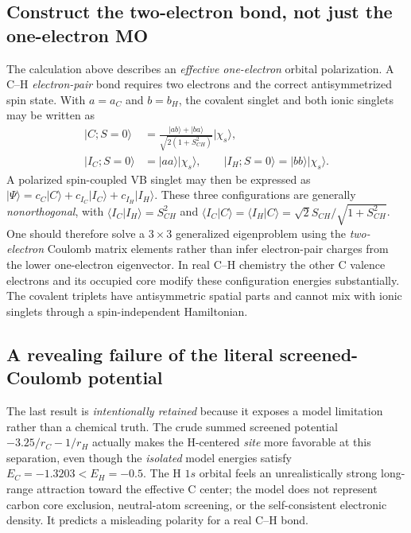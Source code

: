 \documentclass[11pt,letterpaper]{article}
\newcommand{\ket}[1]{\lvert #1\rangle}
\begin{document}
\subsection{Construct the two-electron bond, not just the one-electron MO}
The calculation above describes an \emph{effective one-electron} orbital polarization. A C--H \emph{electron-pair} bond requires two electrons and the correct antisymmetrized spin state. With $a=a_C$ and $b=b_H$, the covalent singlet and both ionic singlets may be written as
\begin{equation}\label{eq:chcovionic}
\begin{aligned}
\ket{C;S=0}&=\frac{\ket{ab}+\ket{ba}}{\sqrt{2(1+S_{CH}^2)}}\ket{\chi_s},\\
\ket{I_C;S=0}&=\ket{aa}\ket{\chi_s},\qquad
\ket{I_H;S=0}=\ket{bb}\ket{\chi_s}.
\end{aligned}
\end{equation}
A polarized spin-coupled VB singlet may then be expressed as $\ket{\Psi}=c_C\ket{C}+c_{I_C}\ket{I_C}+c_{I_H}\ket{I_H}$. These three configurations are generally \emph{nonorthogonal}, with $\langle I_C|I_H\rangle=S_{CH}^2$ and $\langle I_C|C\rangle=\langle I_H|C\rangle=\sqrt2S_{CH}/\sqrt{1+S_{CH}^2}$. One should therefore solve a $3\times3$ generalized eigenproblem using the \emph{two-electron} Coulomb matrix elements rather than infer electron-pair charges from the lower one-electron eigenvector. In real C--H chemistry the other C valence electrons and its occupied core modify these configuration energies substantially. The covalent triplets have antisymmetric spatial parts and cannot mix with ionic singlets through a spin-independent Hamiltonian.

\subsection{A revealing failure of the literal screened-Coulomb potential}
The last result is \emph{intentionally retained} because it exposes a model limitation rather than a chemical truth. The crude summed screened potential $-3.25/r_C-1/r_H$ actually makes the H-centered \emph{site} more favorable at this separation, even though the \emph{isolated} model energies satisfy $E_C=-1.3203<E_H=-0.5$. The H $1s$ orbital feels an unrealistically strong long-range attraction toward the effective C center; the model does not represent carbon core exclusion, neutral-atom screening, or the self-consistent electronic density. It predicts a misleading polarity for a real C--H bond.
\end{document}
